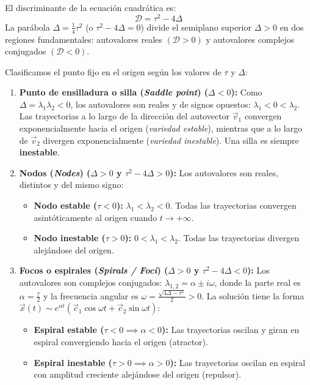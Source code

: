 El discriminante de la ecuación cuadrática es:
\begin{equation}
    \mathcal{D} = \tau^2 - 4\Delta
\end{equation}
La parábola $\Delta = \frac{1}{4}\tau^2$ (o $\tau^2 - 4\Delta = 0$) divide el semiplano superior $\Delta > 0$ en dos regiones fundamentales: autovalores reales $(\mathcal{D} > 0)$ y autovalores complejos conjugados $(\mathcal{D} < 0)$.

\begin{definition}
Clasificamos el punto fijo en el origen según los valores de $\tau$ y $\Delta$:
\begin{enumerate}
    \item \textbf{Punto de ensilladura o silla (\emph{Saddle point}) ($\Delta < 0$):}
    Como $\Delta = \lambda_1 \lambda_2 < 0$, los autovalores son reales y de signos opuestos: $\lambda_1 < 0 < \lambda_2$. Las trayectorias a lo largo de la dirección del autovector $\vec{v}_1$ convergen exponencialmente hacia el origen (\emph{variedad estable}), mientras que a lo largo de $\vec{v}_2$ divergen exponencialmente (\emph{variedad inestable}). Una silla es siempre \textbf{inestable}.
    
    \item \textbf{Nodos (\emph{Nodes}) ($\Delta > 0$ y $\tau^2 - 4\Delta > 0$):}
    Los autovalores son reales, distintos y del mismo signo:
    \begin{itemize}
        \item \textbf{Nodo estable ($\tau < 0$):} $\lambda_1 < \lambda_2 < 0$. Todas las trayectorias convergen asintóticamente al origen cuando $t \to +\infty$.
        \item \textbf{Nodo inestable ($\tau > 0$):} $0 < \lambda_1 < \lambda_2$. Todas las trayectorias divergen alejándose del origen.
    \end{itemize}

    \item \textbf{Focos o espirales (\emph{Spirals / Foci}) ($\Delta > 0$ y $\tau^2 - 4\Delta < 0$):}
    Los autovalores son complejos conjugados: $\lambda_{1,2} = \alpha \pm i\omega$, donde la parte real es $\alpha = \frac{\tau}{2}$ y la frecuencia angular es $\omega = \frac{\sqrt{4\Delta - \tau^2}}{2} > 0$. La solución tiene la forma $\vec{x}(t) \sim e^{\alpha t}(\vec{c}_1 \cos\omega t + \vec{c}_2 \sin\omega t)$:
    \begin{itemize}
        \item \textbf{Espiral estable ($\tau < 0 \implies \alpha < 0$):} Las trayectorias oscilan y giran en espiral convergiendo hacia el origen (atractor).
        \item \textbf{Espiral inestable ($\tau > 0 \implies \alpha > 0$):} Las trayectorias oscilan en espiral con amplitud creciente alejándose del origen (repulsor).
    \end{itemize}


\end{enumerate}
\end{definition}
